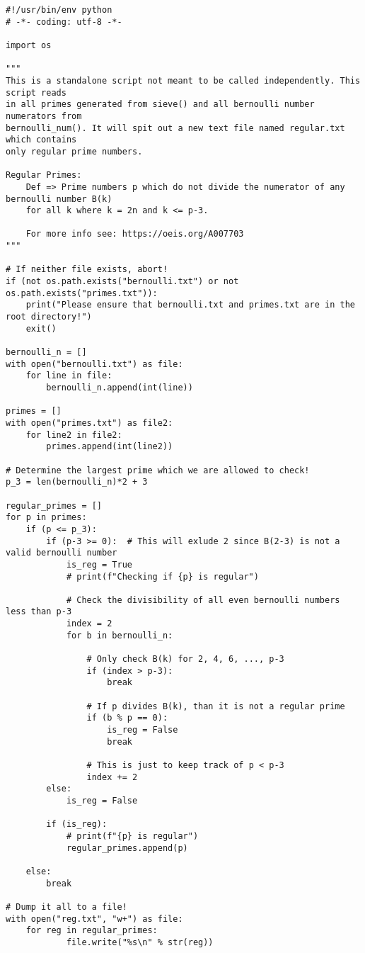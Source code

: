 \documentclass[11pt]{article}
\begin{document}
    \newpage
    \lstset{style=EddiePythonStyle}
    \begin{lstlisting}
#!/usr/bin/env python
# -*- coding: utf-8 -*-

import os

"""
This is a standalone script not meant to be called independently. This script reads
in all primes generated from sieve() and all bernoulli number numerators from
bernoulli_num(). It will spit out a new text file named regular.txt which contains
only regular prime numbers.

Regular Primes:
    Def => Prime numbers p which do not divide the numerator of any bernoulli number B(k)
    for all k where k = 2n and k <= p-3.

    For more info see: https://oeis.org/A007703
"""

# If neither file exists, abort!
if (not os.path.exists("bernoulli.txt") or not os.path.exists("primes.txt")):
    print("Please ensure that bernoulli.txt and primes.txt are in the root directory!")
    exit()

bernoulli_n = []
with open("bernoulli.txt") as file:
    for line in file:
        bernoulli_n.append(int(line))

primes = []
with open("primes.txt") as file2:
    for line2 in file2:
        primes.append(int(line2))

# Determine the largest prime which we are allowed to check!
p_3 = len(bernoulli_n)*2 + 3

regular_primes = []
for p in primes:
    if (p <= p_3):
        if (p-3 >= 0):  # This will exlude 2 since B(2-3) is not a valid bernoulli number
            is_reg = True
            # print(f"Checking if {p} is regular")

            # Check the divisibility of all even bernoulli numbers less than p-3
            index = 2 
            for b in bernoulli_n:

                # Only check B(k) for 2, 4, 6, ..., p-3
                if (index > p-3):
                    break

                # If p divides B(k), than it is not a regular prime
                if (b % p == 0):
                    is_reg = False
                    break

                # This is just to keep track of p < p-3
                index += 2
        else:
            is_reg = False

        if (is_reg):
            # print(f"{p} is regular")
            regular_primes.append(p)

    else:
        break

# Dump it all to a file!
with open("reg.txt", "w+") as file:
    for reg in regular_primes:
            file.write("%s\n" % str(reg))
    \end{lstlisting}
\end{document}
